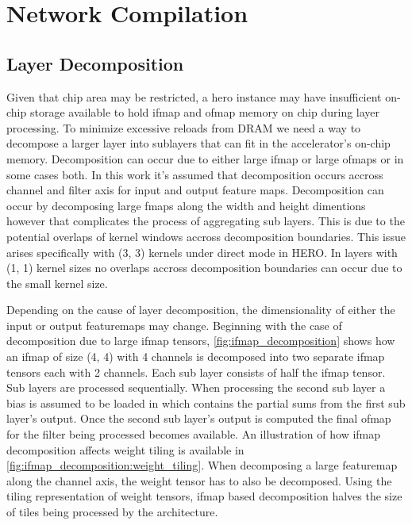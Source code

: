 \chapter{Network Compilation}
\label{chap:net_compile}

\section{Layer Decomposition}
\label{chap:net_compile:layer_decomposition}

Given that chip area may be restricted, a hero instance may have
insufficient on-chip storage available to hold ifmap and ofmap memory on chip
during layer processing. To minimize excessive reloads from DRAM we need a way to decompose a
larger layer into sublayers that can fit in the accelerator's on-chip memory.
Decomposition can occur due to either large ifmap or large ofmaps or in some cases
both. In this work it's assumed that decomposition occurs accross channel and
filter axis for input and output feature maps. Decomposition can occur by
decomposing large fmaps along the width and height dimentions however that
complicates the process of aggregating sub layers. This is due to the potential overlaps
of kernel windows accross decomposition boundaries. This issue arises
specifically with (3, 3) kernels under direct mode in HERO. In layers with (1,
1) kernel sizes no overlaps accross decomposition boundaries can occur due to
the small kernel size. 

Depending on the cause of layer decomposition, the dimensionality of either the
input or output featuremaps may change. Beginning with the case of decomposition due
to large ifmap tensors, \autoref{fig:ifmap_decomposition} shows how an ifmap
of size (4, 4) with 4 channels is decomposed into two separate ifmap tensors
each with 2 channels. Each sub layer consists of half the ifmap tensor. Sub
layers are processed sequentially. When
processing the second sub layer a bias is assumed to be loaded in which contains
the partial sums from the first sub layer's output. Once the second sub layer's
output is computed the final ofmap for the filter being processed becomes
available. An illustration of how ifmap decomposition affects weight tiling is
available in \autoref{fig:ifmap_decomposition:weight_tiling}. When decomposing a
large featuremap along the channel axis, the weight tensor has to also be
decomposed. Using the tiling representation of weight tensors, ifmap based
decomposition halves the size of tiles being processed by the architecture. 

